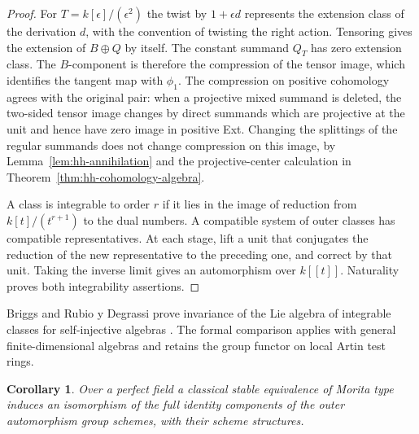 \documentclass[12pt,a4paper,english,reqno]{amsart}
\numberwithin{equation}{section}
\theoremstyle{plain}
\newtheorem{corollary}[theorem]{Corollary}
\theoremstyle{definition}
\begin{document}
\begin{proof}
For $T=k[\epsilon]/(\epsilon^2)$ the twist by
$1+\epsilon d$ represents the extension class of the derivation
$d$, with the convention of twisting the right action. Tensoring
gives the extension of $B\oplus Q$ by itself. The constant summand
$Q_T$ has zero extension class. The $B$-component is therefore
the compression of the tensor image, which identifies the tangent
map with $\phi_1$. The compression on positive cohomology agrees
with the original pair: when a projective mixed summand is
deleted, the two-sided tensor image changes by direct summands
which are projective at the unit and hence have zero image in
positive Ext. Changing the splittings of the regular summands
does not change compression on this image, by
Lemma~\ref{lem:hh-annihilation} and the projective-center
calculation in Theorem~\ref{thm:hh-cohomology-algebra}.

A class is integrable to order $r$ if it lies in the image of
reduction from $k[t]/(t^{r+1})$ to the dual numbers. A compatible
system of outer classes has compatible representatives. At each
stage, lift a unit that conjugates the reduction of the new
representative to the preceding one, and correct by that unit.
Taking the inverse limit gives an automorphism over $k[[t]]$.
Naturality proves both integrability assertions.
\end{proof}

Briggs and Rubio y Degrassi prove invariance of the Lie algebra
of integrable classes for self-injective algebras
\cite{BriggsRubioIntegrable}. The formal comparison applies
with general finite-dimensional algebras and retains the group
functor on local Artin test rings.

\begin{corollary}\label{thm:outer-group-scheme}
Over a perfect field a classical stable equivalence of Morita
type induces an isomorphism of the full identity components
of the outer automorphism group schemes, with their scheme
structures.
\end{corollary}
\end{document}
